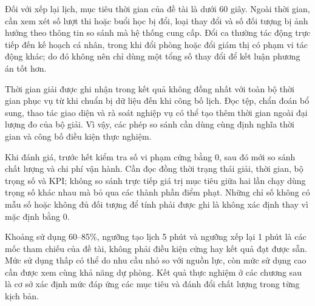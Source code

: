Đối với xếp lại lịch, mục tiêu thời gian của đề tài là dưới 60 giây. Ngoài thời gian, cần xem xét số lượt thi hoặc buổi học bị đổi, loại thay đổi và số đối tượng bị ảnh hưởng theo thông tin so sánh mà hệ thống cung cấp. Đổi ca thường tác động trực tiếp đến kế hoạch cá nhân, trong khi đổi phòng hoặc đổi giám thị có phạm vi tác động khác; do đó không nên chỉ dùng một tổng số thay đổi để kết luận phương án tốt hơn.

Thời gian giải được ghi nhận trong kết quả không đồng nhất với toàn bộ thời gian phục vụ từ khi chuẩn bị dữ liệu đến khi công bố lịch. Đọc tệp, chẩn đoán bổ sung, thao tác giao diện và rà soát nghiệp vụ có thể tạo thêm thời gian ngoài đại lượng đo của bộ giải. Vì vậy, các phép so sánh cần dùng cùng định nghĩa thời gian và công bố điều kiện thực nghiệm.

Khi đánh giá, trước hết kiểm tra số vi phạm cứng bằng 0, sau đó mới so sánh chất lượng và chi phí vận hành. Cần đọc đồng thời trạng thái giải, thời gian, bộ trọng số và KPI; không so sánh trực tiếp giá trị mục tiêu giữa hai lần chạy dùng trọng số khác nhau mà bỏ qua các thành phần điểm phạt. Những chỉ số không có mẫu số hoặc không đủ đối tượng để tính phải được ghi là không xác định thay vì mặc định bằng 0.

Khoảng sử dụng 60--85\%, ngưỡng tạo lịch 5 phút và ngưỡng xếp lại 1 phút là các mốc tham chiếu của đề tài, không phải điều kiện cứng hay kết quả đạt được sẵn. Mức sử dụng thấp có thể do nhu cầu nhỏ so với nguồn lực, còn mức sử dụng cao cần được xem cùng khả năng dự phòng. Kết quả thực nghiệm ở các chương sau là cơ sở xác định mức đáp ứng các mục tiêu và đánh đổi chất lượng trong từng kịch bản.
